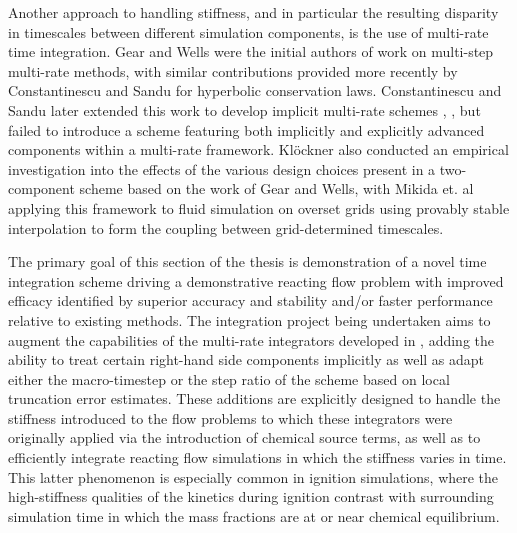 Another approach to handling stiffness, and in particular the resulting disparity in
timescales between different simulation components, is the use of multi-rate
time integration. Gear and Wells \cite{gear1984multirate} were the initial authors of
work on multi-step multi-rate methods, with similar contributions provided more
recently by Constantinescu and Sandu \cite{constantinescu2007multirate} for hyperbolic
conservation laws. Constantinescu and Sandu later extended this work to develop implicit
multi-rate schemes \cite{constantinescu2010extrapolated},
\cite{constantinescu2013extrapolated}, but failed to introduce a scheme featuring both
implicitly and explicitly advanced components within a multi-rate framework. Kl\"{o}ckner
\cite{klockner2010high} also conducted an empirical investigation into the effects of the various design choices
present in a two-component scheme based on the work of Gear and Wells, with Mikida et. al
\cite{mikida2019multi} applying this framework to fluid simulation on overset grids using provably stable
interpolation to form the coupling between grid-determined timescales.


The primary goal of this section of the thesis is demonstration of a novel
time integration scheme driving a demonstrative reacting flow problem
with improved efficacy identified by superior accuracy and stability and/or
faster performance relative to existing methods. The integration project
being undertaken aims to augment the capabilities of the multi-rate integrators
developed in \cite{mikida2019multi}, adding the ability to treat certain
right-hand side components implicitly as well as adapt either the macro-timestep
or the step ratio of the scheme based on local truncation error estimates. These
additions are explicitly designed to handle the stiffness introduced to the flow
problems to which these integrators were originally applied via the introduction
of chemical source terms, as well as to efficiently integrate reacting flow
simulations in which the stiffness varies in time. This latter phenomenon is especially
common in ignition simulations, where the high-stiffness qualities of the
kinetics during ignition contrast with surrounding simulation time in which
the mass fractions are at or near chemical equilibrium.


